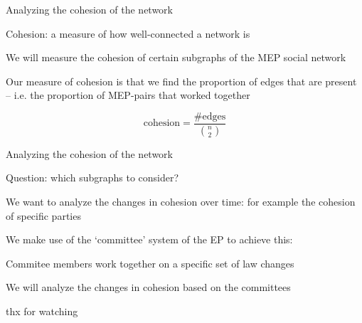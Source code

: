 \documentclass{beamer}
\begin{document}
\begin{frame}{Analyzing the cohesion of the network}
	
	Cohesion: a measure of how well-connected a network is
	
	\vspace{2mm}
	
	\pause We will measure the cohesion of certain subgraphs of the MEP social network
	
	\vspace{2mm}
	
	\pause Our measure of cohesion is that we find the proportion of edges that are present -- i.e. the proportion of MEP-pairs that worked together
	
	\pause \[
		\text{cohesion} = \frac{\#\text{edges}}{\binom{n}{2}}
	\]
	
\end{frame}

\begin{frame}{Analyzing the cohesion of the network}
	
	Question: which subgraphs to consider?
	
	\vspace{2mm}
	
	\pause We want to analyze the changes in cohesion over time: for example the cohesion of specific parties
	
	\vspace{2mm}
	
	\pause We make use of the `committee' system of the EP to achieve this:
	
	\vspace{2mm}
	
	\pause Commitee members work together on a specific set of law changes
	
	\vspace{2mm}
	
	\pause We will analyze the changes in cohesion based on the committees
	
\end{frame}

\begin{frame}{}
	
	thx for watching
	
\end{frame}
\end{document}
